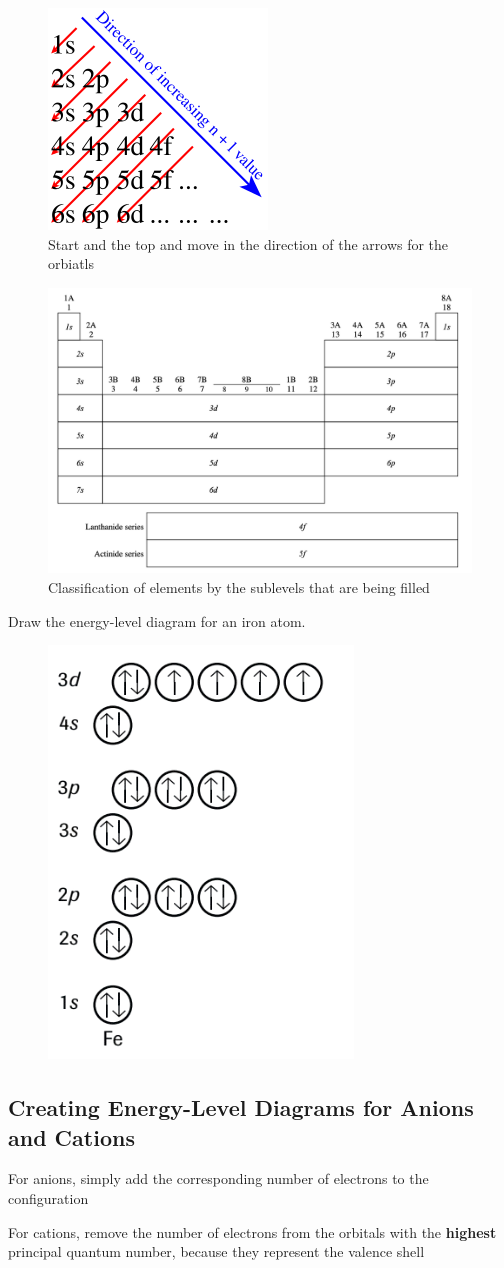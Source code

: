 \begin{figure}[ht!]
    \centering
    \includegraphics[width=0.2 \textwidth]{../figures/aufbau-principle.png}
    \caption{Start and the top and move in the direction of the arrows for the orbiatls}
    \label{fig:aufbau-principle}
\end{figure}

\newpage

\begin{figure}[ht!]
    \centering
    \includegraphics[width=0.6 \textwidth]{../figures/electron-configurations.png}
    \caption{Classification of elements by the sublevels that are being filled}
    \label{fig:electron-configurations}
\end{figure}

\begin{sample}{Draw the energy-level diagram for an iron atom.}
    \begin{figure}[ht!]
        \centering
        \includegraphics[width=0.2 \textwidth]{../figures/energy-level-diagram-iron.png}
    \end{figure}
\end{sample}

\subsection{Creating Energy-Level Diagrams for Anions and Cations}
\begin{bulleted-list}
    \item For anions, simply add the corresponding number of electrons to the configuration
    \item For cations, remove the number of electrons from the orbitals with the \textbf{highest}
        principal quantum number, because they represent the valence shell
\end{bulleted-list}


